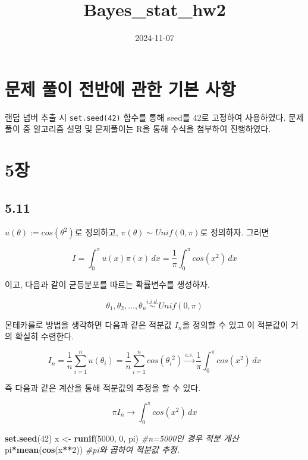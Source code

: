 \documentclass[
]{article}
\title{Bayes\_stat\_hw2}
\author{}
\date{\vspace{-2.5em}2024-11-07}
\newenvironment{Shaded}{\begin{snugshade}}{\end{snugshade}}
\newcommand{\CommentTok}[1]{\textcolor[rgb]{0.56,0.35,0.01}{\textit{#1}}}
\newcommand{\DecValTok}[1]{\textcolor[rgb]{0.00,0.00,0.81}{#1}}
\newcommand{\FunctionTok}[1]{\textcolor[rgb]{0.13,0.29,0.53}{\textbf{#1}}}
\newcommand{\NormalTok}[1]{#1}
\newcommand{\OtherTok}[1]{\textcolor[rgb]{0.56,0.35,0.01}{#1}}
\newcommand{\SpecialCharTok}[1]{\textcolor[rgb]{0.81,0.36,0.00}{\textbf{#1}}}
\begin{document}
\maketitle

\section{문제 풀이 전반에 관한 기본
사항}\label{uxbb38uxc81c-uxd480uxc774-uxc804uxbc18uxc5d0-uxad00uxd55c-uxae30uxbcf8-uxc0acuxd56d}

랜덤 넘버 추출 시 \texttt{set.seed(42)} 함수를 통해 seed를 42로 고정하여
사용하였다. 문제 풀이 중 알고리즘 설명 및 문제풀이는 R을 통해 수식을
첨부하여 진행하였다.

\section{5장}\label{uxc7a5}

\subsection{5.11}\label{section}

\(u({\theta}) := cos({\theta^2})\)로 정의하고,
\({\pi({\theta})} {\sim} Unif(0, {\pi})\)로 정의하자. 그러면

\[I = \int_{0}^{{\pi}} u(x){\pi}(x)\, dx = \frac{1}{{\pi}} \int_{0}^{{\pi}} cos(x^2)\, dx\]

이고, 다음과 같이 균등분포를 따르는 확률변수를 생성하자.

\[{\theta}_1, {\theta}_2, \ldots, {\theta}_n \stackrel{i.i.d.}{\sim} Unif(0, {\pi})\]

몬테카를로 방법을 생각하면 다음과 같은 적분값 \(I_n\)을 정의할 수 있고
이 적분값이 거의 확실히 수렴한다.

\[I_n = \frac{1}{n}\sum_{i=1}^n u({\theta_i}) = \frac{1}{n}\sum_{i=1}^n cos({\theta_i}^2) \xrightarrow{\text{a.s.}} \frac {1}{{\pi}}\int_{0}^{{\pi}} cos(x^2)\, dx\]

즉 다음과 같은 계산을 통해 적분값의 추정을 할 수 있다.

\[{\pi}I_n \xrightarrow{} \int_{0}^{{\pi}} cos(x^2)\, dx\]

\begin{Shaded}
\begin{Highlighting}[]
\FunctionTok{set.seed}\NormalTok{(}\DecValTok{42}\NormalTok{)}
\NormalTok{x }\OtherTok{\textless{}{-}} \FunctionTok{runif}\NormalTok{(}\DecValTok{5000}\NormalTok{, }\DecValTok{0}\NormalTok{, pi) }\CommentTok{\#n=5000인 경우 적분 계산}
\NormalTok{pi}\SpecialCharTok{*}\FunctionTok{mean}\NormalTok{(}\FunctionTok{cos}\NormalTok{(x}\SpecialCharTok{**}\DecValTok{2}\NormalTok{)) }\CommentTok{\#pi와 곱하여 적분값 추정. }
\end{Highlighting}
\end{Shaded}
\end{document}
